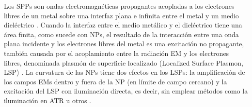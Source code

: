 Los SPPs son ondas electromagnéticas propagantes acopladas a los electrones libres de un metal sobre una interfaz plana e infinita entre el metal y un medio dieléctrico \cite{maier2007plasmonics}. Cuando la interfaz  entre el medio metálico y el dieléctrico tiene una área finita, como sucede con NPs, el resultado de la interacción entre una onda plana incidente y los electrones libres del metal es una excitación no propagante, también causada por el acoplamiento entre la radiación EM y los electrones libres, denominada plasmón de superficie localizado (Localized Surface Plasmon, LSP) \cite{maier2007plasmonics}. La curvatura de las NPs tiene dos efectos en los LSPs: la amplificación de los campos EMs dentro y fuera de la NP (en límite de campo cercano) y la excitación del LSP con iluminación directa, es decir, sin emplear métodos como la iluminación en ATR u otros \cite{maier2007plasmonics}.

